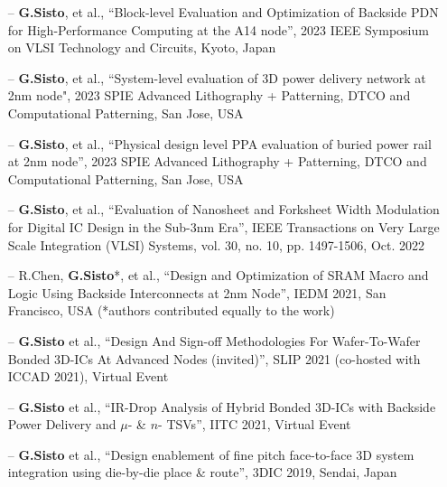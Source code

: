 \documentclass[10pt,a4paper,fancychapters]{altacv}
\begin{document}
\medskip

\newpage
\begin{fullwidth}
\begin{itemize}
    \setlength{\itemindent}{0.5em}
    \item[--] \small{\textbf{G.Sisto},  et al., ``Block-level Evaluation and Optimization of Backside PDN for
    High-Performance Computing at the A14 node'', 2023 IEEE Symposium on VLSI Technology and Circuits, Kyoto, Japan} 
    \item[--] \small{\textbf{G.Sisto},  et al., ``System-level evaluation of 3D power delivery network at 2nm node", 2023 SPIE Advanced Lithography + Patterning, DTCO and Computational Patterning, San Jose, USA} 
    \item[--] \small{\textbf{G.Sisto},  et al., ``Physical design level PPA evaluation of buried power rail at 2nm
    node'', 2023 SPIE Advanced Lithography + Patterning, DTCO and Computational Patterning, San Jose, USA} 
    \item[--] \small{\textbf{G.Sisto},  et al., ``Evaluation of Nanosheet and Forksheet Width Modulation for Digital IC
    Design in the Sub-3nm Era'', IEEE Transactions on Very Large Scale Integration (VLSI) Systems, vol. 30, no. 10, pp.
    1497-1506, Oct. 2022} 
    \item[--] \small{R.Chen, \textbf{G.Sisto}*,  et al., ``Design and Optimization of SRAM Macro and Logic Using Backside
    Interconnects at 2nm Node'', IEDM 2021, San Francisco, USA (*authors contributed equally to the work)} 
    \item[--] \small{\textbf{G.Sisto}  et al., ``Design And Sign-off Methodologies For
    Wafer-To-Wafer Bonded 3D-ICs At Advanced Nodes (invited)'', SLIP 2021 (co-hosted with ICCAD 2021), Virtual Event}
    \item[--] \small{\textbf{G.Sisto} et al., ``IR-Drop Analysis of Hybrid Bonded 3D-ICs with Backside Power Delivery
    and $\mu$- \& $n$- TSVs'', IITC 2021, Virtual Event} 
    \item[--] \small{\textbf{G.Sisto} et al., ``Design enablement of fine pitch face-to-face 3D system integration using die-by-die place \& route'', 3DIC 2019, Sendai, Japan}
\end{itemize}
\end{fullwidth}
\end{document}
